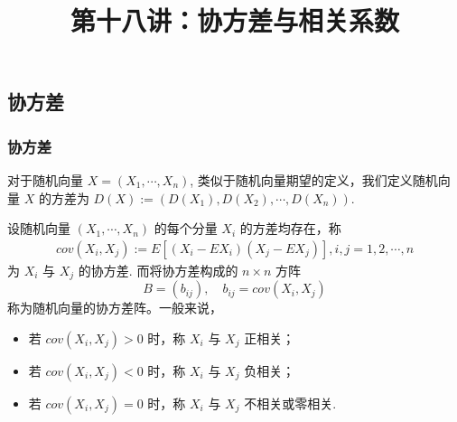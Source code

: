 \documentclass[Prob-All.tex]{subfiles}
\begin{document}
\title[概率论]{第十八讲：协方差与相关系数}
\date{}

{ 
	\begin{frame}
		\titlepage
	\end{frame}
}
\subsection{协方差}
\begin{frame}
	\frametitle{协方差}
	\begin{defi}
		对于随机向量 $X=(X_1,\cdots,X_n)$, 类似于随机向量期望的定义，我们定义随机向量 $X$ 的方差为 $D (X):=(D (X_1),D (X_2),\cdots, D (X_n))$.
	\end{defi}

	\pause
	\begin{defi}
		设随机向量 $(X_1,\cdots,X_n)$ 的每个分量 $X_i$ 的方差均存在，称
		\begin{eqnarray*}
			cov(X_i,X_j):=E[(X_i-EX_i)(X_j-EX_j)], i,j=1,2,\cdots,n
		\end{eqnarray*}
		为 $X_i$ 与 $X_j$ 的协方差. \pause 而将协方差构成的 $n\times n$ 方阵
		$$B=(b_{ij}),\quad b_{ij}=cov (X_i,X_j)$$ 称为随机向量的协方差阵。一般来说，\pause
		\begin{itemize}[<+-|alert@+>]
			\item 若 $cov (X_i,X_j)>0$ 时，称 $X_i$ 与 $X_j$ 正相关；
			\item 若 $cov (X_i,X_j)<0$ 时，称 $X_i$ 与 $X_j$ 负相关；
			\item 若 $cov (X_i,X_j)=0$ 时，称 $X_i$ 与 $X_j$ 不相关或零相关.
		\end{itemize}
	\end{defi}
\end{frame}
\end{document}
